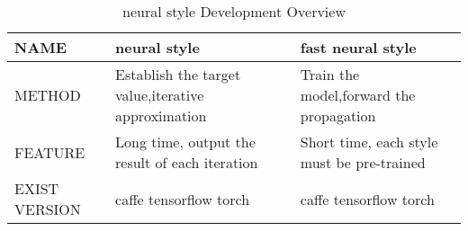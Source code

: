 \begin{table}[H]
\centering
\begin{tabular}{lll}
\toprule
  NAME     & neural style\cite{neural-style}    & fast neural style\cite{fast-neural-style-tensorflow} \\
\midrule
METHOD   & Establish the target value,iterative approximation  & Train the model,forward the propagation       \\
FEATURE     & Long time,  output the result of each iteration & Short time, each style must be pre-trained  \\
EXIST VERSION &caffe tensorflow torch & caffe tensorflow torch \\
\bottomrule
\end{tabular}
\caption{neural style Development Overview}
\label{tbl:compare-neural-style}
\end{table}
